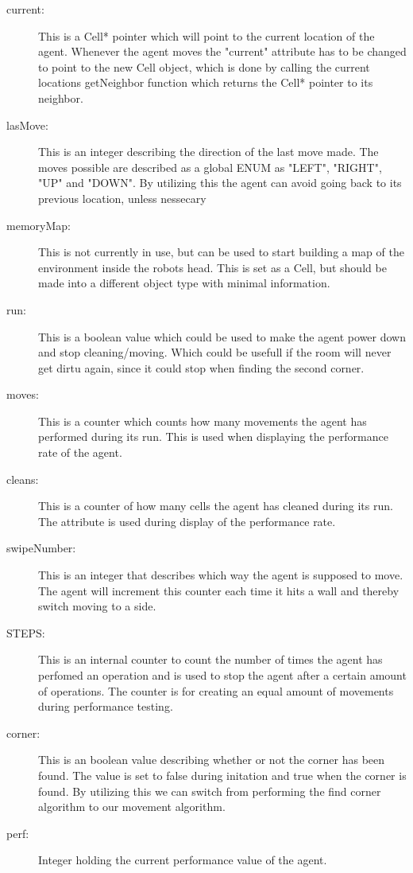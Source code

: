 \begin{description}
\item[current:]
	This is a Cell* pointer which will point to the current location of the agent.
	Whenever the agent moves the "current" attribute has to be changed to point to
	the new Cell object, which is done by calling the current locations getNeighbor
	function which returns the Cell* pointer to its neighbor.
\item[lasMove:]
	This is an integer describing the direction of the last move made. The moves
	possible are described as a global ENUM as "LEFT", "RIGHT", "UP" and "DOWN".
	By utilizing this the agent can avoid going back to its previous location,
	unless nessecary
\item[memoryMap:]
	This is not currently in use, but can be used to start building a map of the
	environment inside the robots head.  This is set as a Cell, but should be made
	into a different object type with minimal information.
\item[run:]
	This is a boolean value which could  be used to make the agent power down and
	stop cleaning/moving.  Which could be usefull if the room will never get dirtu
	again, since it could stop when finding the second corner.
\item[moves:]
	This is a counter which counts how many movements the agent has performed
	during its run.  This is used when displaying the performance rate of the
	agent.
\item[cleans:]
	This is a counter of how many cells the agent has cleaned during its run. The
	attribute is used during display of the performance rate.
\item[swipeNumber:]
	This is an integer that describes which way the agent is supposed to move.
	The agent will increment this counter each time it hits a wall and thereby
	switch moving to a side. 
\item[STEPS:]
	This is an internal counter to count the number of times the agent has
	perfomed an operation and is used to stop the agent after a certain amount of
	operations.  The counter is for creating an equal amount of movements during
	performance testing.
\item[corner:]
	This is an boolean value describing whether or not the corner has been found.
	The value is set to false during initation and true when the corner is found.
	By utilizing this we can switch from performing the find  corner algorithm to
	our movement algorithm.
\item[perf:]
	Integer holding the current performance value of the agent.
\end{description}

